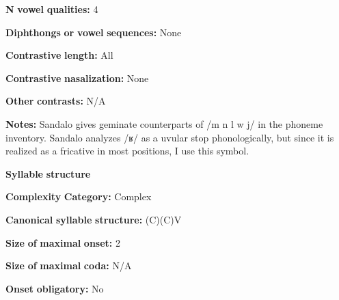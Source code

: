\begin{styleBody}
\textbf{N} \textbf{vowel} \textbf{qualities:} 4
\end{styleBody}

\begin{styleBody}
\textbf{Diphthongs} \textbf{or} \textbf{vowel} \textbf{sequences:} None
\end{styleBody}

\begin{styleBody}
\textbf{Contrastive} \textbf{length:} All
\end{styleBody}

\begin{styleBody}
\textbf{Contrastive} \textbf{nasalization:} None
\end{styleBody}

\begin{styleBody}
\textbf{Other} \textbf{contrasts:} N/A
\end{styleBody}

\begin{styleBody}
\textbf{Notes:} Sandalo gives geminate counterparts of /m n l w j/ in the phoneme inventory. Sandalo analyzes /ʁ/ as a uvular stop phonologically, but since it is realized as a fricative in most positions, I use this symbol.
\end{styleBody}

\begin{styleBody}
\textbf{Syllable} \textbf{structure}
\end{styleBody}

\begin{styleBody}
\textbf{Complexity} \textbf{Category:} Complex
\end{styleBody}

\begin{styleBody}
\textbf{Canonical} \textbf{syllable} \textbf{structure:} (C)(C)V \citep[17-18]{Sandalo1997}
\end{styleBody}

\begin{styleBody}
\textbf{Size} \textbf{of} \textbf{maximal} \textbf{onset:} 2
\end{styleBody}

\begin{styleBody}
\textbf{Size} \textbf{of} \textbf{maximal} \textbf{coda:} N/A
\end{styleBody}

\begin{styleBody}
\textbf{Onset} \textbf{obligatory:} No
\end{styleBody}

